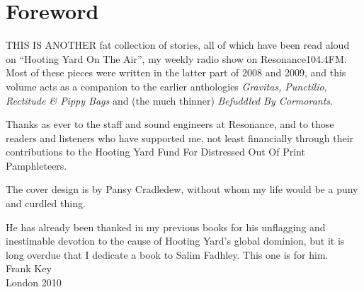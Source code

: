 \chapter*{Foreword}

THIS IS ANOTHER fat collection of stories, all of which have been read aloud on ``Hooting Yard On The Air'', my weekly radio show on Resonance104.4FM. Most of these pieces were written in the latter part of 2008 and 2009, and this volume acts as a companion to the earlier anthologies \emph{Gravitas, Punctilio, Rectitude \& Pippy Bags} and (the much thinner) \emph{Befuddled By Cormorants}.

Thanks as ever to the staff and sound engineers at Resonance, and to those readers and listeners who have supported me, not least financially through their contributions to the Hooting Yard Fund For Distressed Out Of Print Pamphleteers.

The cover design is by Pansy Cradledew, without whom my life would be a puny and curdled thing.

He has already been thanked in my previous books for his unflagging and inestimable devotion to the cause of Hooting Yard's global dominion, but it is long overdue that I dedicate a book to Salim Fadhley. This one is for him.
\\[2cm]
Frank Key\\
London 2010
